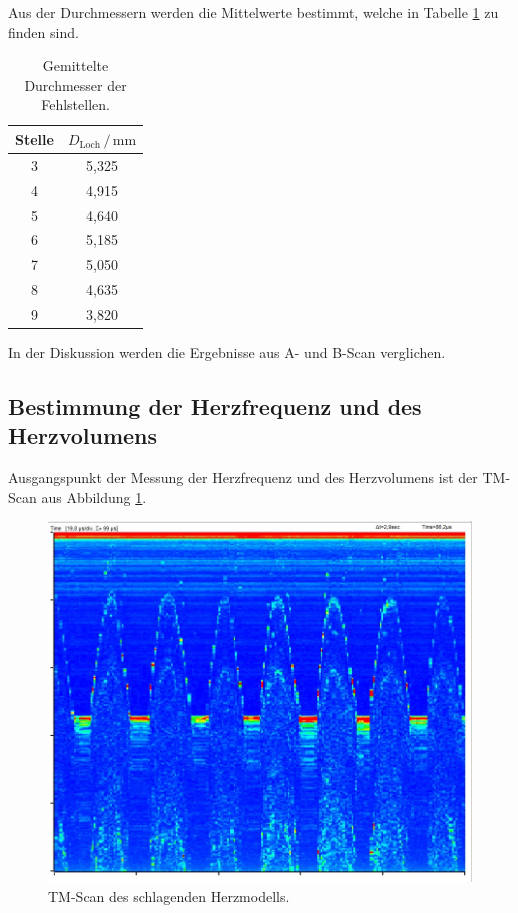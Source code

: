 Aus der Durchmessern werden die Mittelwerte bestimmt, welche in Tabelle \ref{tab:mess5} zu finden sind. 

\begin{table}
\centering
\caption{Gemittelte Durchmesser der Fehlstellen.}
\label{tab:mess5}
\begin{tabular}{c c}
\toprule
Stelle & $D_\text{Loch} \,/\, \si{\milli\meter}$\\
\midrule 
3 & 5,325\\
4 & 4,915\\
5 & 4,640\\
6 & 5,185\\
7 & 5,050\\
8 & 4,635\\
9 & 3,820\\
\bottomrule
\end{tabular}
\end{table}

In der Diskussion werden die Ergebnisse aus A- und B-Scan verglichen.

\subsection{Bestimmung der Herzfrequenz und des Herzvolumens}

Ausgangspunkt der Messung der Herzfrequenz und des Herzvolumens ist der TM-Scan aus 
Abbildung \ref{fig:tm}. 

\begin{figure}
  \centering
  \includegraphics[scale=0.3]{content/tm.jpg}
  \caption{TM-Scan des schlagenden Herzmodells.}
  \label{fig:tm}
\end{figure}


